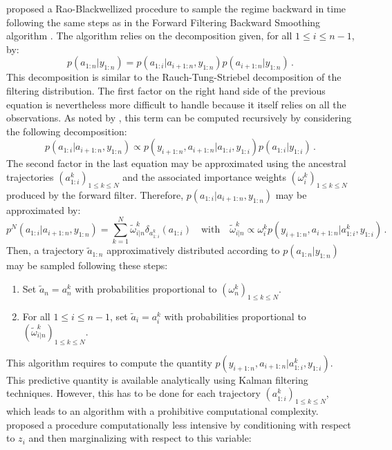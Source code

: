 \documentclass[nolayout]{article}
\theoremstyle{plain}
\theoremstyle{definition}
\newcommand{\1}{\mathbbm{1}}
\def\eqsp{\,}
\begin{document}
\cite{sarkka:bunch:godsill:2012,lindsten:bunch:godsill:schon:2013,lindsten:bunch:sarkka:schon:godsill:2015} proposed a Rao-Blackwellized procedure to sample the regime backward in time following the same steps as in the Forward Filtering Backward Smoothing algorithm \cite{huerzeler:kunsch:1998,doucet:godsill:andrieu:2000}. The algorithm relies on the decomposition given, for all $1\le i \le n-1$, by:
\[
p(a_{1:n}|y_{1:n}) = p(a_{1:i}|a_{i+1:n},y_{1:n})p(a_{i+1:n}|y_{1:n})\eqsp.
\]
This decomposition is similar to the Rauch-Tung-Striebel decomposition of the filtering distribution. The first factor on the right hand side of the previous equation is nevertheless more difficult to handle because it itself relies on all the observations. As noted by \cite{sarkka:bunch:godsill:2012}, this term can be computed recursively by considering the following decomposition:
\begin{equation}
\label{eq:FFBS:decomp}
p(a_{1:i}|a_{i+1:n},y_{1:n}) \propto p(y_{i+1:n},a_{i+1:n}|a_{1:i},y_{1:i})p(a_{1:i}|y_{1:i})\eqsp.
\end{equation}
The second factor in the last equation may be approximated using the ancestral  trajectories $(a^k_{1:i})_{1\le k \le N}$ and the associated importance weights $(\omega^k_{i})_{1\le k \le N}$ produced by the forward filter. Therefore, $p(a_{1:i}|a_{i+1:n},y_{1:n})$ may be approximated by:
\[
p^N(a_{1:i}|a_{i+1:n},y_{1:n}) = \sum_{k=1}^N \tilde{\omega}^k_{i|n}\delta_{a^k_{1:i}}(a_{1:i}) \quad \text{with} \quad \tilde{\omega}^k_{i|n} \propto \omega_i^k p(y_{i+1:n},a_{i+1:n}|a^k_{1:i},y_{1:i}) \eqsp.
\]
Then, a trajectory $\tilde{a}_{1:n}$ approximatively distributed according to $p(a_{1:n}|y_{1:n})$ may be sampled following these steps:
\begin{enumerate}[-]
\item Set $\tilde{a}_n= a_n^k$ with probabilities proportional to $(\omega_n^k)_{1\le k \le N}$.
\item For all $1\le i\le n-1$, set $\tilde{a}_i = a_i^k$ with probabilities proportional to $(\tilde{\omega}_{i|n}^k)_{1\le k \le N}$.
\end{enumerate}
This algorithm requires to compute the quantity  $p(y_{i+1:n},a_{i+1:n}|a^k_{1:i},y_{1:i})$. This predictive quantity is available analytically using  Kalman filtering techniques. However, this has to be done for each trajectory $(a^k_{1:i})_{1\le k \le N}$, which leads to an algorithm with a prohibitive computational complexity. \cite{lindsten:bunch:sarkka:schon:godsill:2015} proposed a procedure computationally less intensive by conditioning with respect to $z_i$ and then marginalizing with respect to this variable:
\end{document}
